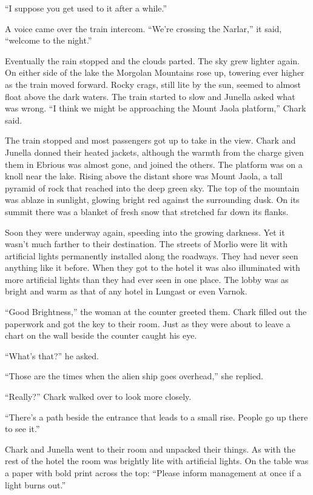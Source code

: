 ``I suppose you get used to it after a while.''

A voice came over the train intercom. ``We're crossing the Narlar,'' it said, ``welcome to the
night.''

Eventually the rain stopped and the clouds parted. The sky grew lighter again. On either side of
the lake the Morgolan Mountains rose up, towering ever higher as the train moved forward. Rocky
crags, still lite by the sun, seemed to almost float above the dark waters. The train started to
slow and Junella asked what was wrong. ``I think we might be approaching the Mount Jaola
platform,'' Chark said.

The train stopped and most passengers got up to take in the view. Chark and Junella donned their
heated jackets, although the warmth from the charge given them in Ebrious was almost gone, and
joined the others. The platform was on a knoll near the lake. Rising above the distant shore was
Mount Jaola, a tall pyramid of rock that reached into the deep green sky. The top of the
mountain was ablaze in sunlight, glowing bright red against the surrounding dusk. On its summit
there was a blanket of fresh snow that stretched far down its flanks.

Soon they were underway again, speeding into the growing darkness. Yet it wasn't much farther to
their destination. The streets of Morlio were lit with artificial lights permanently installed
along the roadways. They had never seen anything like it before. When they got to the hotel it
was also illuminated with more artificial lights than they had ever seen in one place. The lobby
was as bright and warm as that of any hotel in Lungast or even Varnok.

``Good Brightness,'' the woman at the counter greeted them. Chark filled out the paperwork and
got the key to their room. Just as they were about to leave a chart on the wall beside the
counter caught his eye.

``What's that?'' he asked.

``Those are the times when the alien ship goes overhead,'' she replied.

``Really?'' Chark walked over to look more closely.

``There's a path beside the entrance that leads to a small rise. People go up there to see it.''

Chark and Junella went to their room and unpacked their things. As with the rest of the hotel
the room was brightly lite with artificial lights. On the table was a paper with bold print
across the top: ``Please inform management at once if a light burns out.''

